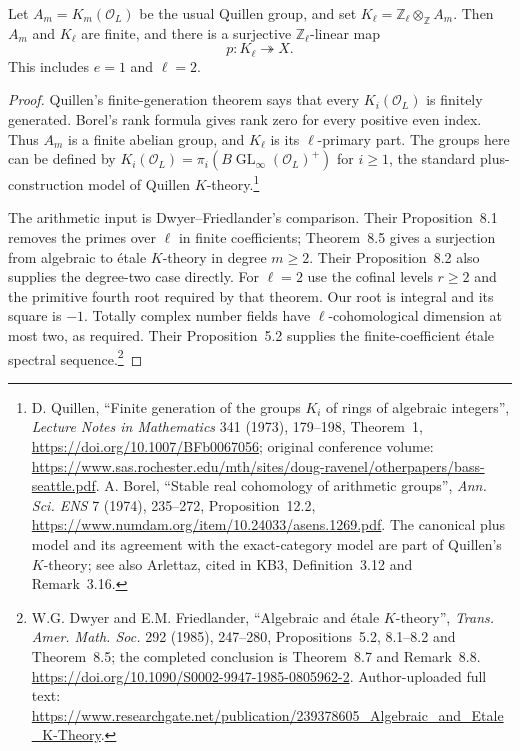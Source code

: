 \begin{proposition}
\label{claim:KB2}
Let $A_m=K_m(\mathcal O_L)$ be the usual Quillen group, and set
$K_\ell=\mathbb Z_\ell\otimes_{\mathbb Z}A_m$.  Then $A_m$ and
$K_\ell$ are finite, and there is a surjective
$\mathbb Z_\ell$-linear map
\[
                    p:K_\ell\twoheadrightarrow X.
 \tag{KB.7}
\]
This includes $e=1$ and $\ell=2$.
\end{proposition}

\begin{proof}
Quillen's finite-generation theorem says that every
$K_i(\mathcal O_L)$ is finitely generated.  Borel's rank formula
gives rank zero for every positive even index.  Thus $A_m$ is a
finite abelian group, and $K_\ell$ is its $\ell$-primary part.
The groups here can be defined by
$K_i(\mathcal O_L)=\pi_i(B\operatorname{GL}_\infty(\mathcal O_L)^+)$
for $i\ge1$, the standard plus-construction model of Quillen
$K$-theory.\footnote{D. Quillen, ``Finite generation of the groups
$K_i$ of rings of algebraic integers'', \emph{Lecture Notes in
Mathematics} 341 (1973), 179--198, Theorem~1,
\url{https://doi.org/10.1007/BFb0067056}; original conference volume:
\url{https://www.sas.rochester.edu/mth/sites/doug-ravenel/otherpapers/bass-seattle.pdf}.
A. Borel, ``Stable real cohomology of arithmetic groups'',
\emph{Ann. Sci. ENS} 7 (1974), 235--272, Proposition~12.2,
\url{https://www.numdam.org/item/10.24033/asens.1269.pdf}.
The canonical plus model and its agreement with the exact-category
model are part of Quillen's $K$-theory; see also Arlettaz, cited in
KB3, Definition~3.12 and Remark~3.16.}

The arithmetic input is Dwyer--Friedlander's comparison.
Their Proposition~8.1 removes the primes over $\ell$ in finite
coefficients; Theorem~8.5 gives a surjection from algebraic to
\'{e}tale $K$-theory in degree $m\ge2$.  Their Proposition~8.2
also supplies the degree-two case directly.
For $\ell=2$ use the cofinal levels $r\ge2$ and the primitive
fourth root required by that theorem.  Our root is integral and
its square is $-1$.  Totally complex number fields have
$\ell$-cohomological dimension at most two, as required.
Their Proposition~5.2 supplies the finite-coefficient
\'{e}tale spectral sequence.\footnote{W.G. Dwyer and E.M. Friedlander,
``Algebraic and \'{e}tale $K$-theory'', \emph{Trans. Amer. Math. Soc.}
292 (1985), 247--280, Propositions~5.2, 8.1--8.2 and Theorem~8.5;
the completed conclusion is Theorem~8.7 and Remark~8.8.
\url{https://doi.org/10.1090/S0002-9947-1985-0805962-2}.
Author-uploaded full text:
\url{https://www.researchgate.net/publication/239378605_Algebraic_and_Etale_K-Theory}.}


\end{proof}
